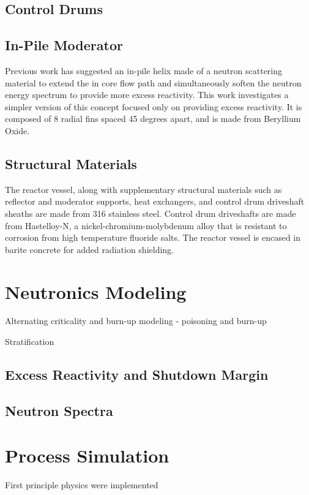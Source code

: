 \subsection{Control Drums}


\subsection{In-Pile Moderator}
Previous work \cite{CarterPHD} has suggested an in-pile helix made of a neutron scattering material to extend the in core flow path and simultaneously soften the neutron energy spectrum to provide more excess reactivity. This work investigates a simpler version of this concept focused only on providing excess reactivity. It is composed of 8 radial fins spaced 45 degrees apart, and is made from Beryllium Oxide.

\subsection{Structural Materials}
The reactor vessel, along with supplementary structural materials such as reflector and moderator supports, heat exchangers, and control drum driveshaft sheaths are made from 316 stainless steel. Control drum driveshafts are made from Hastelloy-N, a nickel-chromium-molybdenum alloy that is resistant to corrosion from high temperature fluoride salts. The reactor vessel is encased in barite concrete for added radiation shielding.

\section{Neutronics Modeling}\label{Section:Serpent}
Alternating criticality and burn-up modeling - poisoning and burn-up

Stratification
\subsection{Excess Reactivity and Shutdown Margin}


\subsection{Neutron Spectra}

\section{Process Simulation}\label{Section:Python}
First principle physics were implemented 